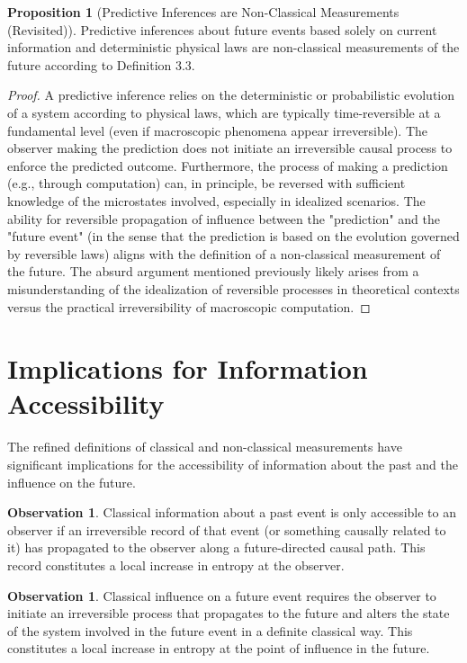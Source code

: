 \documentclass{article}
\theoremstyle{definition}
\newtheorem{proposition}[definition]{Proposition}
\newtheorem{observation}[definition]{Observation}
\begin{document}
	\begin{proposition}[Predictive Inferences are Non-Classical Measurements (Revisited)]
		Predictive inferences about future events based solely on current information and deterministic physical laws are non-classical measurements of the future according to Definition 3.3.
		\begin{proof}
			A predictive inference relies on the deterministic or probabilistic evolution of a system according to physical laws, which are typically time-reversible at a fundamental level (even if macroscopic phenomena appear irreversible). The observer making the prediction does not initiate an irreversible causal process to enforce the predicted outcome. Furthermore, the process of making a prediction (e.g., through computation) can, in principle, be reversed with sufficient knowledge of the microstates involved, especially in idealized scenarios. The ability for reversible propagation of influence between the "prediction" and the "future event" (in the sense that the prediction is based on the evolution governed by reversible laws) aligns with the definition of a non-classical measurement of the future. The absurd argument mentioned previously likely arises from a misunderstanding of the idealization of reversible processes in theoretical contexts versus the practical irreversibility of macroscopic computation.
		\end{proof}
	\end{proposition}
	
	\section{Implications for Information Accessibility}
	
	The refined definitions of classical and non-classical measurements have significant implications for the accessibility of information about the past and the influence on the future.
	
	\begin{observation}
		Classical information about a past event is only accessible to an observer if an irreversible record of that event (or something causally related to it) has propagated to the observer along a future-directed causal path. This record constitutes a local increase in entropy at the observer.
	\end{observation}
	
	\begin{observation}
		Classical influence on a future event requires the observer to initiate an irreversible process that propagates to the future and alters the state of the system involved in the future event in a definite classical way. This constitutes a local increase in entropy at the point of influence in the future.
	\end{observation}
	
\end{document}
